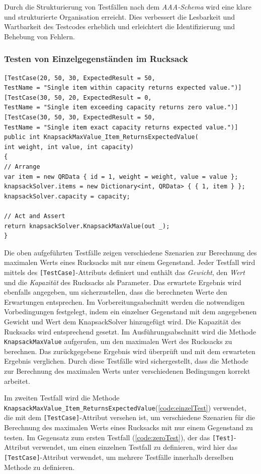 Durch die Strukturierung von Testfällen nach dem \textit{AAA-Schema} wird eine klare und strukturierte Organisation erreicht. Dies verbessert die Lesbarkeit und Wartbarkeit des Testcodes erheblich und erleichtert die Identifizierung und Behebung von Fehlern.

\subsubsection{Testen von Einzelgegenständen im Rucksack}

\begin{lstlisting}[style=csharp, caption={Testfall: einzelne Gegenstände}, label={code:einzelTest}]
[TestCase(20, 50, 30, ExpectedResult = 50,
TestName = "Single item within capacity returns expected value.")]
[TestCase(30, 50, 20, ExpectedResult = 0,
TestName = "Single item exceeding capacity returns zero value.")]
[TestCase(30, 50, 30, ExpectedResult = 50,
TestName = "Single item exact capacity returns expected value.")]
public int KnapsackMaxValue_Item_ReturnsExpectedValue(
int weight, int value, int capacity)
{
// Arrange
var item = new QRData { id = 1, weight = weight, value = value };
knapsackSolver.items = new Dictionary<int, QRData> { { 1, item } };
knapsackSolver.capacity = capacity;

// Act and Assert
return knapsackSolver.KnapsackMaxValue(out _);
}
\end{lstlisting}

Die oben aufgeführten Testfälle zeigen verschiedene Szenarien zur Berechnung des maximalen Werts eines Rucksacks mit nur einem Gegenstand. Jeder Testfall wird mittels des \texttt{[TestCase]}-Attributs definiert und enthält das \textit{Gewicht}, den \textit{Wert} und die \textit{Kapazität} des Rucksacks als Parameter. Das erwartete Ergebnis wird ebenfalls angegeben, um sicherzustellen, dass die berechneten Werte den Erwartungen entsprechen. Im Vorbereitungsabschnitt werden die notwendigen Vorbedingungen festgelegt, indem ein einzelner Gegenstand mit dem angegebenen Gewicht und Wert dem KnapsackSolver hinzugefügt wird. Die Kapazität des Rucksacks wird entsprechend gesetzt. Im Ausführungsabschnitt wird die Methode \texttt{KnapsackMaxValue} aufgerufen, um den maximalen Wert des Rucksacks zu berechnen. Das zurückgegebene Ergebnis wird überprüft und mit dem erwarteten Ergebnis verglichen. Durch diese Testfälle wird sichergestellt, dass die Methode zur Berechnung des maximalen Werts unter verschiedenen Bedingungen korrekt arbeitet.

Im zweiten Testfall wird die Methode \texttt{KnapsackMaxValue\_Item\_ReturnsExpectedValue}(\ref{code:einzelTest}) verwendet, die mit dem \texttt{[TestCase]}-Attribut versehen ist, um verschiedene Szenarien für die Berechnung des maximalen Werts eines Rucksacks mit nur einem Gegenstand zu testen. Im Gegensatz zum ersten Testfall (\ref{code:zeroTest}), der das \texttt{[Test]}-Attribut verwendet, um einen einzelnen Testfall zu definieren, wird hier das \texttt{[TestCase]}-Attribut verwendet, um mehrere Testfälle innerhalb derselben Methode zu definieren.

